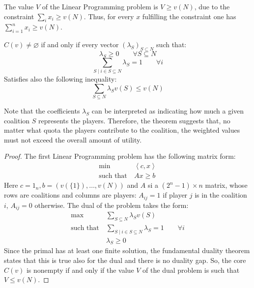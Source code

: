 \noindent The value $V$ of the Linear Programming problem is $V\geq v(N)$, due to the constraint $\sum_ix_i\geq v(N)$. 
Thus, for every $x$ fulfilling the constraint one has $\sum_{i=1}^{n}x_i\geq v(N)$. 
\begin{theorem}
    $C(v)\neq\varnothing$ if and only if every vector $(\lambda_S)_{S\subset N}$ such that: 
    \[\lambda_S\geq 0 \qquad \forall S\subseteq N\]
    \[\sum_{S\mid i \in S\subseteq N}\lambda_S=1\qquad \forall i\]
    Satisfies also the following inequality: 
    \[\sum_{S\subseteq N}\lambda_Sv(S)\leq v(N)\]
\end{theorem}
\noindent Note that the coefficients $\lambda_S$ can be interpreted as indicating how much a given coalition $S$ represents the players. 
Therefore, the theorem suggests that, no matter what quota the players contribute to the coalition, the weighted values must not exceed the overall amount of utility.
\begin{proof}
    The first Linear Programming problem has the following matrix form: 
    \begin{align*} 
        \min\:&\left\langle c,x \right\rangle  \\
        \text{such that}    \:&Ax\geq b
    \end{align*}
    Here $c=1_n, b=(v(\{1\}),\dots,v(N))$ and $A$ si a $(2^n-1)\times n$ matrix, whose rows are coalitions and columns are players:  $A_{ij}=1$ if player $j$ is in the coalition $i$, $A_{ij}=0$ otherwise. 
    The dual of the problem takes the form: 
    \begin{align*} 
        \max\:&\sum_{S\subseteq N}\lambda_Sv(S) \\
        \text{such that}    \:&\sum_{S\mid i\in S\subseteq N}\lambda_S=1 \qquad\forall i \\
        \:&\lambda_S\geq0
    \end{align*}
    Since the primal has at least one finite solution, the fundamental duality theorem states that this is true also for the dual and there is no duality gap. 
    So, the core $C(v)$ is nonempty if and only if the value $V$ of the dual problem is such that $V\leq v(N)$. 
\end{proof}

